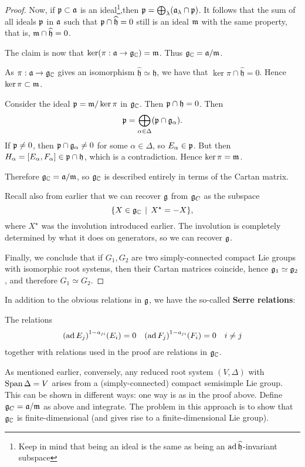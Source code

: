 \documentclass[11pt, english]{article}
\begin{document}
\begin{proof}
Now, if $\mathfrak{p} \subset \mathfrak{a}$ is an ideal\footnote{Keep in mind that being an ideal is the same as being an $\operatorname{ad} \widehat{\mathfrak h}$-invariant subspace},then $\mathfrak{p} = \bigoplus_\lambda (\mathfrak{a}_\lambda \cap \mathfrak{p})$. It follows that the sum of all ideals $\mathfrak{p}$ in $\mathfrak{a}$ such that $\mathfrak{p} \cap \widehat{\mathfrak h} = 0$ still is an ideal $\mathfrak{m}$ with the same property, that is, $\mathfrak{m} \cap \widehat{\mathfrak h} = 0$. 

The claim is now that $\ker (\pi:\mathfrak{a} \to \mathfrak g_{\mathbb{C}})=\mathfrak{m}$. Thus $\mathfrak g_{\mathbb{C}} = \mathfrak{a}/\mathfrak{m}$.

As $\pi:\mathfrak{a} \to \mathfrak g_{\mathbb{C}}$ gives an isomorphism $\widehat{\mathfrak h} \simeq \mathfrak h$, we have that $\ker \pi \cap \widehat{\mathfrak h} = 0$. Hence $\ker \pi \subset \mathfrak{m}$. 

Consider the ideal $\mathfrak{p} = \mathfrak{m}/\ker \pi$ in $\mathfrak g_{\mathbb{C}}$. Then $\mathfrak{p} \cap \mathfrak h=0$. Then
$$
\mathfrak{p} = \bigoplus_{\alpha \in \Delta} (\mathfrak{p} \cap \mathfrak g_\alpha).
$$
If $\mathfrak{p} \neq 0$, then $\mathfrak{p} \cap \mathfrak g_\alpha \neq 0$ for some $\alpha \in \Delta$, so $E_\alpha \in \mathfrak{p}$. But then $H_\alpha = [E_\alpha, F_\alpha] \in \mathfrak{p} \cap \mathfrak h$, which is a contradiction. Hence $\ker \pi = \mathfrak{m}$.

Therefore $\mathfrak g_{\mathbb{C}} = \mathfrak{a} / \mathfrak{m}$, so $\mathfrak g_{\mathbb{C}}$ is described entirely in terms of the Cartan matrix. 

Recall also from earlier that we can recover $\mathfrak g$ from $\mathfrak g_C$ as the subspace
$$
\{ X \in \mathfrak g_{\mathbb{C}} \, \mid \, X^\star = -X \},
$$
where $X^\star$ was the involution introduced earlier. The involution is completely determined by what it does on generators, so we can recover $\mathfrak g$.

Finally, we conclude that if $G_1,G_2$ are two simply-connected compact Lie groups with isomorphic root systems, then their Cartan matrices coincide, hence $\mathfrak g_1 \simeq \mathfrak g_2$, and therefore $G_1 \simeq G_2$.
\end{proof}

In addition to the obvious relations in $\mathfrak g$, we have the so-called \textbf{Serre relations}:

\begin{prop}[Fact]
The relations
\begin{align*}
{(\operatorname{ad}E_j)}^{1-a_{ji}}(E_i) = 0 && {(\operatorname{ad} F_j)}^{1-a_{ji}}(F_i) = 0 \quad i \neq j
\end{align*}
together with relations used in the proof are relations in $\mathfrak g_{\mathbb{C}}$.
\end{prop}

As mentioned earlier, conversely, any reduced root system $(V,\Delta)$ with $\operatorname{Span} \Delta = V$ arises from a (simply-connected) compact semisimple Lie group. This can be shown in different ways: one way is as in the proof above. Define $\mathfrak g_C = \mathfrak{a} / \mathfrak{m}$ as above and integrate. The problem in this approach is to show that $\mathfrak g_{\mathbb{C}}$ is finite-dimensional (and gives rise to a finite-dimensional Lie group). 
\end{document}
